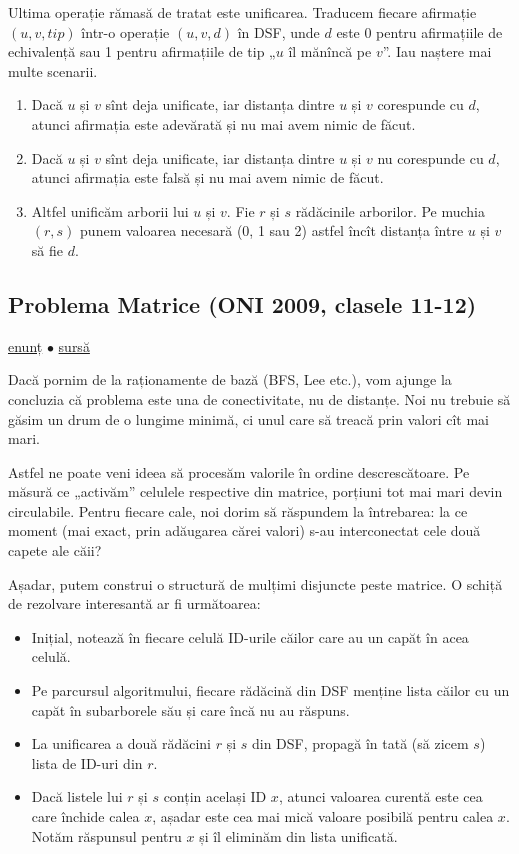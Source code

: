 \documentclass[../main.tex]{subfiles}
\begin{document}
Ultima operație rămasă de tratat este unificarea. Traducem fiecare afirmație $(u, v, tip)$ într-o operație $(u, v, d)$ în DSF, unde $d$ este 0 pentru afirmațiile de echivalență sau 1 pentru afirmațiile de tip „$u$ îl mănîncă pe $v$”. Iau naștere mai multe scenarii.

\begin{enumerate}
  \item Dacă $u$ și $v$ sînt deja unificate, iar distanța dintre $u$ și $v$ corespunde cu $d$, atunci afirmația este adevărată și nu mai avem nimic de făcut.
  \item Dacă $u$ și $v$ sînt deja unificate, iar distanța dintre $u$ și $v$ nu corespunde cu $d$, atunci afirmația este falsă și nu mai avem nimic de făcut.
  \item Altfel unificăm arborii lui $u$ și $v$. Fie $r$ și $s$ rădăcinile arborilor. Pe muchia $(r, s)$ punem valoarea necesară (0, 1 sau 2) astfel încît distanța între $u$ și $v$ să fie $d$.
\end{enumerate}


\subsection{Problema Matrice (ONI 2009, clasele 11-12)}
\label{problem:matrice}

\href{https://kilonova.ro/problems/177}{enunț}
$\bullet$
\hyperref[code:matrice]{sursă}

Dacă pornim de la raționamente de bază (BFS, Lee etc.), vom ajunge la concluzia că problema este una de conectivitate, nu de distanțe. Noi nu trebuie să găsim un drum de o lungime minimă, ci unul care să treacă prin valori cît mai mari.

Astfel ne poate veni ideea să procesăm valorile în ordine descrescătoare. Pe măsură ce „activăm” celulele respective din matrice, porțiuni tot mai mari devin circulabile. Pentru fiecare cale, noi dorim să răspundem la întrebarea: la ce moment (mai exact, prin adăugarea cărei valori) s-au interconectat cele două capete ale căii?

Așadar, putem construi o structură de mulțimi disjuncte peste matrice. O schiță de rezolvare interesantă ar fi următoarea:

\begin{itemize}
  \item Inițial, notează în fiecare celulă ID-urile căilor care au un capăt în acea celulă.
  \item Pe parcursul algoritmului, fiecare rădăcină din DSF menține lista căilor cu un capăt în subarborele său și care încă nu au răspuns.
  \item La unificarea a două rădăcini $r$ și $s$ din DSF, propagă în tată (să zicem $s$) lista de ID-uri din $r$.
  \item Dacă listele lui $r$ și $s$ conțin același ID $x$, atunci valoarea curentă este cea care închide calea $x$, așadar este cea mai mică valoare posibilă pentru calea $x$. Notăm răspunsul pentru $x$ și îl eliminăm din lista unificată.
\end{itemize}
\end{document}
